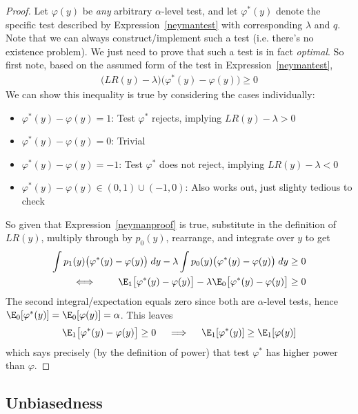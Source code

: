 \documentclass[12pt]{article}
\theoremstyle{plain}
\theoremstyle{definition}
\theoremstyle{remark}
\begin{document}
\begin{proof}
Let $\varphi(y)$ be \emph{any} arbitrary $\alpha$-level test, and
let $\varphi^*(y)$ denote the specific test described by
Expression~\ref{neymantest} with corresponding $\lambda$ and $q$.
Note that we can always construct/implement such a test (i.e.
there's no existence problem). We just need to prove that such a test is
in fact \emph{optimal}.
So first note, based on the assumed form of the test in
Expression~\ref{neymantest},
\begin{align}
  \big(
    LR(y)-\lambda
  \big)
  \big(\varphi^*(y)-\varphi(y)\big)
  \geq 0
  \label{neymanproof}
\end{align}
We can show this inequality is true by considering the cases
individually:
\begin{itemize}
  \item $\varphi^*(y)-\varphi(y)=1$: Test $\varphi^*$ rejects,
    implying $LR(y)-\lambda>0$
  \item $\varphi^*(y)-\varphi(y)=0$: Trivial
  \item $\varphi^*(y)-\varphi(y)=-1$:
    Test $\varphi^*$ does not reject, implying $LR(y)-\lambda<0$
  \item $\varphi^*(y)-\varphi(y)\in (0,1)\cup (-1,0)$:
    Also works out, just slighty tedious to check
\end{itemize}
So given that Expression~\ref{neymanproof} is true, substitute in the
definition of $LR(y)$, multiply through by $p_0(y)$,
rearrange, and integrate over $y$ to get
\begin{align*}
  \int
  p_1(y)
  \big(\varphi^*(y)-\varphi(y)\big)
  \; dy
  - \lambda
  \int
  p_0(y)
  \big(\varphi^*(y)-\varphi(y)\big)
  \; dy
  &\geq 0
  \\
  \iff\qquad
  \E_1\big[ \varphi^*(y)-\varphi(y)\big]
  - \lambda
  \E_0\big[ \varphi^*(y)-\varphi(y)\big]
  &\geq 0
\end{align*}
The second integral/expectation equals zero since both are
$\alpha$-level tests, hence
$\E_0[\varphi^*(y)]=\E_0[\varphi(y)]=\alpha$.
This leaves
\begin{align*}
  \E_1\big[ \varphi^*(y)-\varphi(y)\big]
  \geq 0
  \quad\implies\quad
  \E_1[\varphi^*(y)]
  \geq
  \E_1[\varphi(y)]
\end{align*}
which says precisely (by the definition of power) that test
$\varphi^*$ has higher power than $\varphi$.
\end{proof}

\clearpage
\subsection{Unbiasedness}
\end{document}
